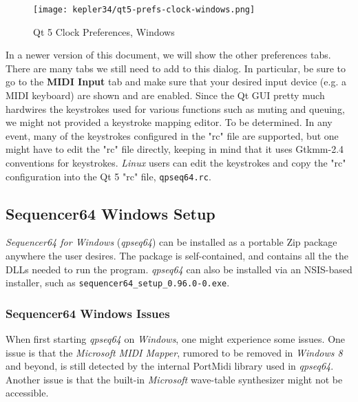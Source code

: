 \begin{figure}[H]
   \centering 
   \texttt{[image: kepler34/qt5-prefs-clock-windows.png]}
   \caption{Qt 5 Clock Preferences, Windows}
   \label{fig:qt5_prefs_clock_windows}
\end{figure}

   In a newer version of this document, we will show the other preferences
   tabs.  There are many tabs we still need to add to this dialog.
   In particular, be sure to go to the \textbf{MIDI Input} tab and
   make sure that your desired input device (e.g. a MIDI keyboard) are shown
   and are enabled.
   Since the Qt GUI pretty much hardwires the keystrokes used for various
   functions such as muting and queuing, we might not provided a keystroke
   mapping editor.  To be determined.
   In any event, many of the keystrokes configured in the "rc" file are
   supported, but one might have to edit the "rc" file directly, keeping
   in mind that it uses Gtkmm-2.4 conventions for keystrokes.
   \textsl{Linux} users can edit the keystrokes and copy the "rc" configuration
   into the Qt 5 "rc" file, \texttt{qpseq64.rc}.

\subsection{Sequencer64 Windows Setup}
\label{subsec:qt_portmidi_windows_setup}

   \textsl{Sequencer64 for Windows} (\textsl{qpseq64}) can be installed
   as a portable Zip package anywhere the user desires.  The package is
   self-contained, and contains all the the DLLs needed to run the program.
   \textsl{qpseq64} can also be installed via an NSIS-based installer,
   such as \texttt{sequencer64\_setup\_0.96.0-0.exe}.

\subsubsection{Sequencer64 Windows Issues}
\label{subsubsec:qt_portmidi_windows_setup_issues}

    When first starting \textsl{qpseq64} on \textsl{Windows}, one might
    experience some issues.  One issue is that the \textsl{Microsoft MIDI
    Mapper}, rumored to be removed in \textsl{Windows 8} and beyond, is still
    detected by the internal PortMidi library used in \textsl{qpseq64}.
    Another issue is that the built-in \textsl{Microsoft} wave-table
    synthesizer might not be accessible.

